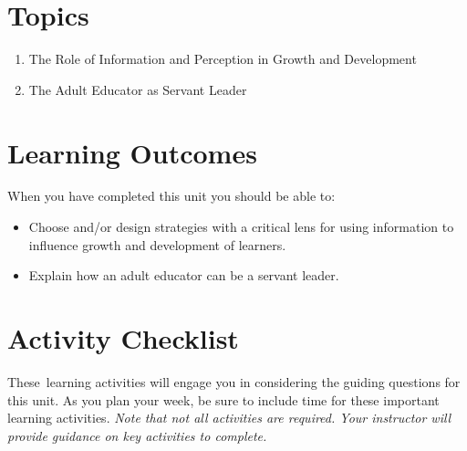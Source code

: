\documentclass[
]{book}
\providecommand{\tightlist}{%
  \setlength{\itemsep}{0pt}\setlength{\parskip}{0pt}}
\begin{document}
\hypertarget{topics-6}{%
\section*{Topics}\label{topics-6}}

\begin{enumerate}
\def\labelenumi{\arabic{enumi}.}
\tightlist
\item
  The Role of Information and Perception in Growth and Development
\item
  The Adult Educator as Servant Leader
\end{enumerate}

\hypertarget{learning-outcomes-6}{%
\section*{Learning Outcomes}\label{learning-outcomes-6}}

When you have completed this unit you should be able to:

\begin{itemize}
\tightlist
\item
  Choose and/or design strategies with a critical lens for using information to influence growth and development of learners.
\item
  Explain how an adult educator can be a servant leader.
\end{itemize}

\hypertarget{activity-checklist-6}{%
\section*{Activity Checklist}\label{activity-checklist-6}}

These~learning activities will engage you in considering the guiding questions for this unit. As you plan your week, be sure to include time for these important learning activities. \emph{Note that not all activities are required. Your instructor will provide guidance on key activities to complete.}
\end{document}
